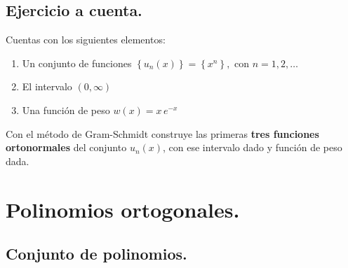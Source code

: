 \subsection{Ejercicio a cuenta.}
Cuentas con los siguientes elementos:
\begin{enumerate}
\item Un conjunto de funciones $\left\{ u_{n} (x) \right\} = \left\{ x^{n} \right\}, \mbox{ con } n = 1, 2, \ldots$
\item El intervalo $(0, \infty)$
\item Una función de peso $w(x) = x \, e^{-x}$
\end{enumerate}
Con el método de Gram-Schmidt construye las primeras \textbf{tres funciones ortonormales} del conjunto $u_{n}(x)$, con ese intervalo dado y función de peso dada.
\section{Polinomios ortogonales.}
\subsection{Conjunto de polinomios.}


